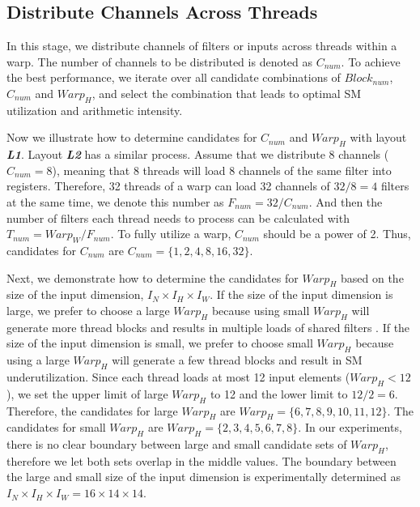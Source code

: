 \subsection{Distribute Channels Across Threads}
In this stage, we distribute channels of filters or inputs across threads within a warp.
The number of channels to be distributed is denoted as $C_{num}$.
To achieve the best performance, we iterate over all candidate combinations of $Block_{num}$, $C_{num}$ and $Warp_H$, and select the combination that leads to optimal SM utilization and arithmetic intensity.

Now we illustrate how to determine candidates for $C_{num}$ and $Warp_H$ with layout \textbf{\emph{L1}}.
Layout \textbf{\emph{L2}} has a similar process.
Assume that we distribute 8 channels ($C_{num}=8$), meaning that 8 threads will load 8 channels of the same filter into registers.
Therefore, 32 threads of a warp can load 32 channels of $32/8=4$ filters at the same time, we denote this number as $F_{num}=32/C_{num}$.
And then the number of filters each thread needs to process can be calculated with $T_{num}=Warp_W/F_{num}$.
To fully utilize a warp, $C_{num}$ should be a power of 2.
Thus, candidates for $C_{num}$ are $C_{num}=\{1,2,4,8,16,32\}$.

Next, we demonstrate how to determine the candidates for $Warp_H$ based on the size of the input dimension, $I_N \times I_H \times I_W$.
If the size of the input dimension is large, we prefer to choose a large $Warp_H$ because using small $Warp_H$ will generate more thread blocks and results in multiple loads of shared filters \cite{jia2020enabling, zheng2020flextensor}.
If the size of the input dimension is small, we prefer to choose small $Warp_H$ because using a large $Warp_H$ will generate a few thread blocks and result in SM underutilization.
Since each thread loads at most 12 input elements ($Warp_H<12$), we set the upper limit of large $Warp_H$ to 12 and the lower limit to $12/2=6$.
Therefore, the candidates for large $Warp_H$ are $Warp_H=\{6,7,8,9,10,11,12\}$.
The candidates for small $Warp_H$ are $Warp_H=\{2,3,4,5,6,7,8\}$.
In our experiments, there is no clear boundary between large and small candidate sets of $Warp_H$, therefore we let both sets overlap in the middle values.
The boundary between the large and small size of the input dimension is experimentally determined as $I_N \times I_H \times I_W=16 \times 14 \times 14$.

